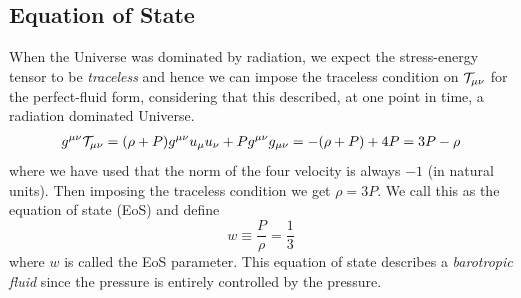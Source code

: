 \subsection{Equation of State}
When the Universe was dominated by radiation, we expect the stress-energy tensor to be \textit{traceless} and hence we can impose the traceless condition on $\mathcal T_{\mu\nu}$ for the perfect-fluid form, considering that this described, at one point in time, a radiation dominated Universe. 
\begin{align*}
    g^{\mu\nu}\mathcal T_{\mu\nu} = (\rho+P)g^{\mu\nu}u_{\mu}u_{\nu}+ P g^{\mu\nu}g_{\mu\nu} = -(\rho+P) + 4P = 3P-\rho
\end{align*}
where we have used that the norm of the four velocity is always $-1$ (in natural units). Then imposing the traceless condition we get $\rho=3P$. We call this as the equation of state (EoS) and define 
$$w \equiv \frac{P}{\rho} = \frac{1}{3}$$
where $w$ is called the EoS parameter. This equation of state describes a \textit{barotropic fluid} since the pressure is entirely controlled by the pressure. 

